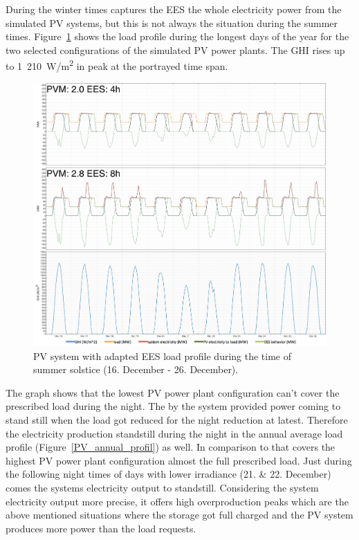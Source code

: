 During the winter times captures the EES the whole electricity power from the simulated PV systems, but this is not always the situation during the summer times. Figure~\ref{PV_summer_load} shows the load profile during the longest days of the year for the two selected configurations of the simulated PV power plants. The GHI rises up to 1~210~W/m\textsuperscript{2} in peak at the portrayed time span.

\begin{figure}[htbp]
\centering
\includegraphics[width=1\linewidth]{FIG/PV_summer_load}
\caption[PV system with adapted EES load profile during the time of summer solstice.]{PV system with adapted EES load profile during the time of summer solstice (16. December - 26. December).}\label{PV_summer_load}
\end{figure}
The graph shows that the lowest PV power plant configuration can't cover the prescribed load during the night. The by the system provided power coming to stand still when the load got reduced for the night reduction at latest. Therefore the electricity production standstill during the night in the annual average load profile (Figure~\ref{PV_annual_profil}) as well. In comparison to that covers the highest PV power plant configuration almost the full prescribed load. Just during the following night times of days with lower irradiance (21. \& 22. December) comes the systems electricity output to standstill. Considering the system electricity output more precise, it offers high overproduction peaks which are the above mentioned situations where the storage got full charged and the PV system produces more power than the load requests.  

